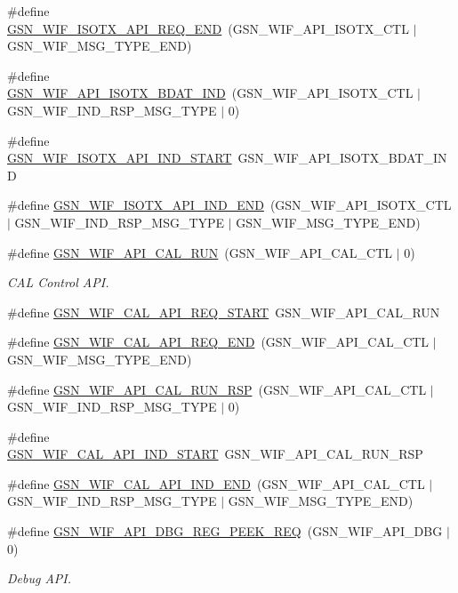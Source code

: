 \begin{DoxyCompactItemize}
\item 
\#define \hyperlink{a00606_a2b181291892e88fc4edb7a8cfca27942}{GSN\_\-WIF\_\-ISOTX\_\-API\_\-REQ\_\-END}~(GSN\_\-WIF\_\-API\_\-ISOTX\_\-CTL $|$ GSN\_\-WIF\_\-MSG\_\-TYPE\_\-END)
\item 
\#define \hyperlink{a00606_a4d597f3f49ec5c3e0d0cef4ae6c1d206}{GSN\_\-WIF\_\-API\_\-ISOTX\_\-BDAT\_\-IND}~(GSN\_\-WIF\_\-API\_\-ISOTX\_\-CTL $|$ GSN\_\-WIF\_\-IND\_\-RSP\_\-MSG\_\-TYPE $|$ 0)
\item 
\#define \hyperlink{a00606_ac00a78bc5243ffae41de840e417dbbe8}{GSN\_\-WIF\_\-ISOTX\_\-API\_\-IND\_\-START}~GSN\_\-WIF\_\-API\_\-ISOTX\_\-BDAT\_\-IND
\item 
\#define \hyperlink{a00606_aa96d7be65446e0dadc82d200a3c45c21}{GSN\_\-WIF\_\-ISOTX\_\-API\_\-IND\_\-END}~(GSN\_\-WIF\_\-API\_\-ISOTX\_\-CTL $|$ GSN\_\-WIF\_\-IND\_\-RSP\_\-MSG\_\-TYPE $|$ GSN\_\-WIF\_\-MSG\_\-TYPE\_\-END)
\item 
\#define \hyperlink{a00636_ga65249c647288361df35fafec69154f96}{GSN\_\-WIF\_\-API\_\-CAL\_\-RUN}~(GSN\_\-WIF\_\-API\_\-CAL\_\-CTL $|$ 0)
\begin{DoxyCompactList}\small\item\em CAL Control API. \end{DoxyCompactList}\item 
\#define \hyperlink{a00606_ae8235399bcb09b9515e753a961d47f1c}{GSN\_\-WIF\_\-CAL\_\-API\_\-REQ\_\-START}~GSN\_\-WIF\_\-API\_\-CAL\_\-RUN
\item 
\#define \hyperlink{a00606_a3ecbea43eead2908ddcc145a26ce4b91}{GSN\_\-WIF\_\-CAL\_\-API\_\-REQ\_\-END}~(GSN\_\-WIF\_\-API\_\-CAL\_\-CTL $|$ GSN\_\-WIF\_\-MSG\_\-TYPE\_\-END)
\item 
\#define \hyperlink{a00606_a337d4e3933a595d66bc47526972379af}{GSN\_\-WIF\_\-API\_\-CAL\_\-RUN\_\-RSP}~(GSN\_\-WIF\_\-API\_\-CAL\_\-CTL $|$ GSN\_\-WIF\_\-IND\_\-RSP\_\-MSG\_\-TYPE $|$ 0)
\item 
\#define \hyperlink{a00606_a59025d140d6b62b1af0e733dea2bbdd6}{GSN\_\-WIF\_\-CAL\_\-API\_\-IND\_\-START}~GSN\_\-WIF\_\-API\_\-CAL\_\-RUN\_\-RSP
\item 
\#define \hyperlink{a00606_a197b7d6afa8a6ab40f07ac83b9368bda}{GSN\_\-WIF\_\-CAL\_\-API\_\-IND\_\-END}~(GSN\_\-WIF\_\-API\_\-CAL\_\-CTL $|$ GSN\_\-WIF\_\-IND\_\-RSP\_\-MSG\_\-TYPE $|$ GSN\_\-WIF\_\-MSG\_\-TYPE\_\-END)
\item 
\#define \hyperlink{a00636_ga141fe1f244ec03a374f1efba9524991c}{GSN\_\-WIF\_\-API\_\-DBG\_\-REG\_\-PEEK\_\-REQ}~(GSN\_\-WIF\_\-API\_\-DBG $|$ 0)
\begin{DoxyCompactList}\small\item\em Debug API. \end{DoxyCompactList}\item 

\end{DoxyCompactItemize}
